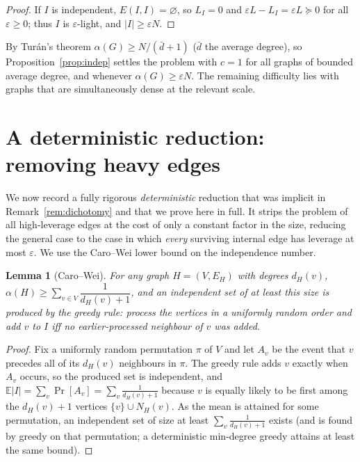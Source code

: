 \documentclass[12pt]{article}
\newcommand{\eps}{\varepsilon}
\newtheorem{lemma}{Lemma}
\theoremstyle{definition}
\begin{document}
\begin{proof}
If $I$ is independent, $E(I,I)=\varnothing$, so $L_I=0$ and
$\eps L-L_I=\eps L\succeq0$ for all $\eps\ge0$; thus $I$ is $\eps$-light, and
$|I|\ge\eps N$.
\end{proof}

By Turán's theorem $\alpha(G)\ge N/(\bar d+1)$ ($\bar d$ the average degree), so
Proposition~\ref{prop:indep} settles the problem with $c=1$ for all graphs of
bounded average degree, and whenever $\alpha(G)\ge\eps N$. The remaining
difficulty lies with graphs that are simultaneously dense at the relevant scale.

\section{A deterministic reduction: removing heavy edges}\label{sec:reduce}

We now record a fully rigorous \emph{deterministic} reduction that was implicit in
Remark~\ref{rem:dichotomy} and that we prove here in full. It strips the problem
of all high-leverage edges at the cost of only a constant factor in the size,
reducing the general case to the case in which \emph{every} surviving internal
edge has leverage at most $\eps$. We use the Caro--Wei lower bound on the
independence number.

\begin{lemma}[Caro--Wei]\label{lem:carowei}
For any graph $H=(V,E_H)$ with degrees $d_H(v)$,
$\alpha(H)\ge\sum_{v\in V}\dfrac{1}{d_H(v)+1}$, and an independent set of at least
this size is produced by the greedy rule: process the vertices in a uniformly
random order and add $v$ to $I$ iff no earlier-processed neighbour of $v$ was
added.
\end{lemma}

\begin{proof}
Fix a uniformly random permutation $\pi$ of $V$ and let $A_v$ be the event that
$v$ precedes all of its $d_H(v)$ neighbours in $\pi$. The greedy rule adds $v$
exactly when $A_v$ occurs, so the produced set is independent, and
$\mathbb E|I|=\sum_v\Pr[A_v]=\sum_v\frac{1}{d_H(v)+1}$ because $v$ is equally
likely to be first among the $d_H(v)+1$ vertices $\{v\}\cup N_H(v)$. As the mean
is attained for some permutation, an independent set of size at least
$\sum_v\frac{1}{d_H(v)+1}$ exists (and is found by greedy on that permutation; a
deterministic min-degree greedy attains at least the same bound).
\end{proof}
\end{document}
